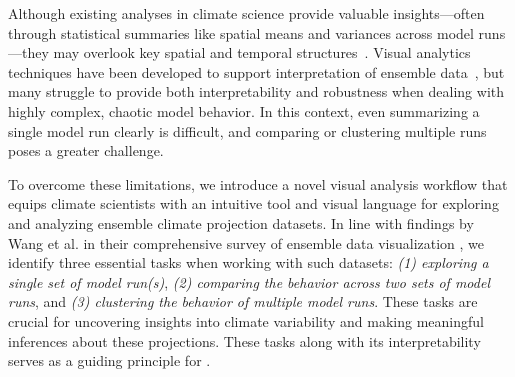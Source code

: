 Although existing analyses in climate science provide valuable insights---often through statistical summaries like spatial means and variances across model runs---they may overlook key spatial and temporal structures~\cite{kappe_exploring_2019}.
Visual analytics techniques have been developed to support interpretation of ensemble data~\cite{biswas2016visualization, kappe_exploring_2019, evers_interactive_2023}, but many struggle to provide both interpretability and robustness when dealing with highly complex, chaotic model behavior.
%
%
%
%
%
In this context, even summarizing a single model run clearly is difficult, and comparing or clustering multiple runs poses a greater challenge.



To overcome these limitations, we introduce a novel visual analysis workflow that equips climate scientists with an intuitive tool and visual language for exploring and analyzing ensemble climate projection datasets. 
%
In line with findings by Wang et al. in their comprehensive survey of ensemble data visualization \cite{wang_visualization_2019}, we identify three essential tasks when working with such datasets: \textit{(1) exploring a single set of model run(s)}, \textit{(2) comparing the behavior across two sets of model runs}, and \textit{(3) clustering the behavior of multiple model runs}. 
%
These tasks are crucial for uncovering insights into climate variability and making meaningful inferences about these projections. 
%
These tasks along with its interpretability serves as a guiding principle for \ClimateSOM.

